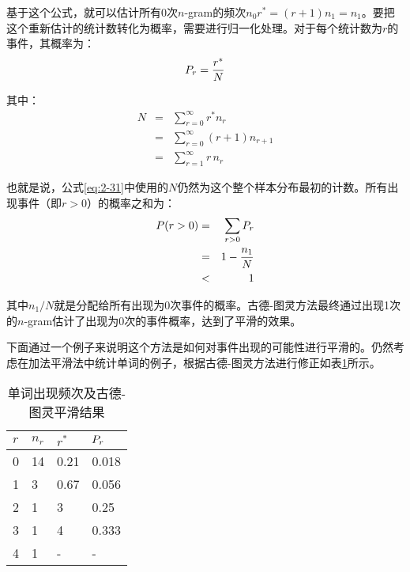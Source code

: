 \parinterval 基于这个公式，就可以估计所有0次$n$-gram的频次$n_0 r^*=(r+1)n_1=n_1$。要把这个重新估计的统计数转化为概率，需要进行归一化处理。对于每个统计数为$r$的事件，其概率为：
\begin{eqnarray}
{P}_r=\frac{r^*}{N}
\label{eq:2-30}
\end{eqnarray}

\noindent 其中：
\begin{eqnarray}
N & = & \sum_{r=0}^{\infty}{r^{*}n_r} \nonumber \\
  & = & \sum_{r=0}^{\infty}{(r + 1)n_{r + 1}} \nonumber \\
  & = & \sum_{r=1}^{\infty}{r\,n_r}
\label{eq:2-31}
\end{eqnarray}

\parinterval 也就是说，公式\eqref{eq:2-31}中使用的$N$仍然为这个整个样本分布最初的计数。所有出现事件（即$r > 0$）的概率之和为：
\begin{eqnarray}
{P}(r>0) & = & \sum_{r>0}{{P}_r} \nonumber \\
                & = & 1 - \frac{n_1}{N} \nonumber \\
                & < & 1
\label{eq:2-32}
\end{eqnarray}

\noindent 其中$n_1/N$就是分配给所有出现为0次事件的概率。古德-图灵方法最终通过出现1次的$n$-gram估计了出现为0次的事件概率，达到了平滑的效果。

\parinterval 下面通过一个例子来说明这个方法是如何对事件出现的可能性进行平滑的。仍然考虑在加法平滑法中统计单词的例子，根据古德-图灵方法进行修正如表\ref{tab:2-2}所示。

\begin{table}[htp]{
\begin{center}
\caption{单词出现频次及古德-图灵平滑结果}
{
\begin{tabular}{l|lll}
\rule{0pt}{10pt} $r$ & $n_r$ & $r^*$ & ${P}_r$\\ \hline
\rule{0pt}{10pt} 0 & 14 & 0.21 & 0.018 \\
\rule{0pt}{10pt} 1 & 3 & 0.67 & 0.056 \\
\rule{0pt}{10pt} 2 & 1 & 3 & 0.25 \\
\rule{0pt}{10pt} 3 & 1 & 4 & 0.333 \\
\rule{0pt}{10pt} 4 & 1 & - & - \\
\end{tabular}
\label{tab:2-2}
}
\end{center}
}\end{table}

